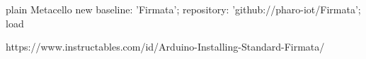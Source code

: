 \documentclass[10pt,twoside,english]{_support/latex/sbabook/sbabook}
\begin{document}
\begin{displaycode}{plain}
  Metacello new
  baseline: 'Firmata';
  repository: 'github://pharo-iot/Firmata';
  load
\end{displaycode}

https://www.instructables.com/id/Arduino-Installing-Standard-Firmata/






\backmatter

\end{document}
